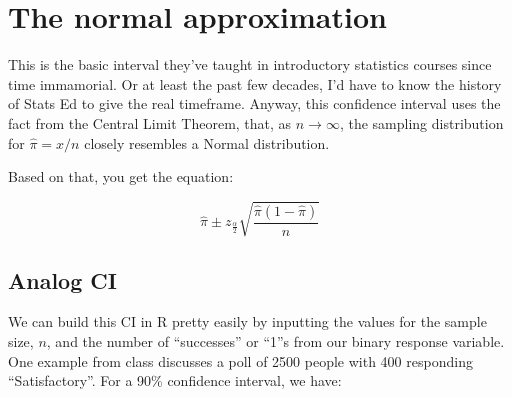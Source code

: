 \documentclass[
]{book}
\newenvironment{Shaded}{\begin{snugshade}}{\end{snugshade}}
\newcommand{\CommentTok}[1]{\textcolor[rgb]{0.56,0.35,0.01}{\textit{#1}}}
\newcommand{\DecValTok}[1]{\textcolor[rgb]{0.00,0.00,0.81}{#1}}
\newcommand{\FloatTok}[1]{\textcolor[rgb]{0.00,0.00,0.81}{#1}}
\newcommand{\KeywordTok}[1]{\textcolor[rgb]{0.13,0.29,0.53}{\textbf{#1}}}
\newcommand{\NormalTok}[1]{#1}
\newcommand{\OperatorTok}[1]{\textcolor[rgb]{0.81,0.36,0.00}{\textbf{#1}}}
\newcommand{\StringTok}[1]{\textcolor[rgb]{0.31,0.60,0.02}{#1}}
\theoremstyle{definition}
\theoremstyle{definition}
\theoremstyle{definition}
\theoremstyle{remark}
\begin{document}
\hypertarget{the-normal-approximation}{%
\section{The normal approximation}\label{the-normal-approximation}}

This is the basic interval they've taught in introductory statistics courses since time immamorial. Or at least the past few decades, I'd have to know the history of Stats Ed to give the real timeframe. Anyway, this confidence interval uses the fact from the Central Limit Theorem, that, as \(n \rightarrow \infty\), the sampling distribution for \(\hat\pi = x/n\) closely resembles a Normal distribution.

Based on that, you get the equation:

\[\hat\pi \pm z_{\frac{\alpha}{2}} \sqrt{\frac{\hat\pi (1 - \hat\pi)}{n}}\]

\hypertarget{analog-ci}{%
\subsection{Analog CI}\label{analog-ci}}

We can build this CI in R pretty easily by inputting the values for the sample size, \(n\), and the number of ``successes'' or ``1''s from our binary response variable. One example from class discusses a poll of 2500 people with 400 responding ``Satisfactory''. For a 90\% confidence interval, we have:

\begin{Shaded}
\end{Shaded}
\end{document}
